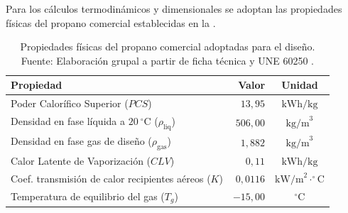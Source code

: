 \documentclass[12pt]{article}
\begin{document}
        \begin{table}[H]
            \centering
            \caption{Tabla maestra de consumidores industriales de la planta metalúrgica. Fuente: Elaboración grupal.}
            \label{tab:consumidores}
        \end{table}

        Para los cálculos termodinámicos y dimensionales se adoptan las propiedades físicas del propano comercial establecidas en la .

        \begin{table}[H]
            \centering
            \caption{Propiedades físicas del propano comercial adoptadas para el diseño. Fuente: Elaboración grupal a partir de ficha técnica y UNE 60250 \cite{une60250}.}
            \label{tab:propiedades_gas}
            \begin{tabular}{lrc}
                \toprule
                \textbf{Propiedad} & \textbf{Valor} & \textbf{Unidad} \\
                \midrule
                Poder Calorífico Superior ($PCS$) & $13,95$ & $\text{kWh/kg}$ \\
                Densidad en fase líquida a $20\ ^{\circ}\text{C}$ ($\rho_{\text{liq}}$) & $506,00$ & $\text{kg/m}^3$ \\
                Densidad en fase gas de diseño ($\rho_{\text{gas}}$) & $1,882$ & $\text{kg/m}^3$ \\
                Calor Latente de Vaporización ($CLV$) & $0,11$ & $\text{kWh/kg}$ \\
                Coef. transmisión de calor recipientes aéreos ($K$) & $0,0116$ & $\text{kW/m}^2\cdot^{\circ}\text{C}$ \\
                Temperatura de equilibrio del gas ($T_g$) & $-15,00$ & $^{\circ}\text{C}$ \\
                \bottomrule
            \end{tabular}
        \end{table}
\end{document}

